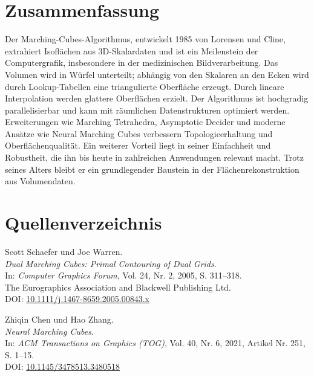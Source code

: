 \documentclass[12pt]{article}
\begin{document}
\section{Zusammenfassung}
Der Marching-Cubes-Algorithmus, entwickelt 1985 von Lorensen und Cline, extrahiert Isoflächen aus 3D-Skalardaten und ist ein Meilenstein der Computergrafik,
insbesondere in der medizinischen Bildverarbeitung.
Das Volumen wird in Würfel unterteilt; abhängig von den Skalaren an den Ecken wird durch Lookup-Tabellen eine triangulierte Oberfläche erzeugt.
Durch lineare Interpolation werden glattere Oberflächen erzielt.
Der Algorithmus ist hochgradig parallelisierbar und kann mit räumlichen Datenstrukturen optimiert werden.
Erweiterungen wie Marching Tetrahedra, Asymptotic Decider und moderne Ansätze wie Neural Marching Cubes verbessern Topologieerhaltung und Oberflächenqualität.
Ein weiterer Vorteil liegt in seiner Einfachheit und Robustheit, die ihn bis heute in zahlreichen Anwendungen relevant macht.
Trotz seines Alters bleibt er ein grundlegender Baustein in der Flächenrekonstruktion aus Volumendaten.
\newpage
\renewcommand{\refname}{}

\section*{Quellenverzeichnis}
\vspace{-2em}
\begin{thebibliography}{99}
Scott Schaefer und Joe Warren.\\
\emph{Dual Marching Cubes: Primal Contouring of Dual Grids}.\\
In: \emph{Computer Graphics Forum}, Vol. 24, Nr. 2, 2005, S. 311--318.\\
The Eurographics Association and Blackwell Publishing Ltd.\\
DOI: \href{https://doi.org/10.1111/j.1467-8659.2005.00843.x}{10.1111/j.1467-8659.2005.00843.x}

Zhiqin Chen und Hao Zhang.\\
\emph{Neural Marching Cubes}.\\
In: \emph{ACM Transactions on Graphics (TOG)}, Vol. 40, Nr. 6, 2021, Artikel Nr. 251, S. 1--15.\\
DOI: \href{https://doi.org/10.1145/3478513.3480518}{10.1145/3478513.3480518}
\end{thebibliography}
\end{document}
